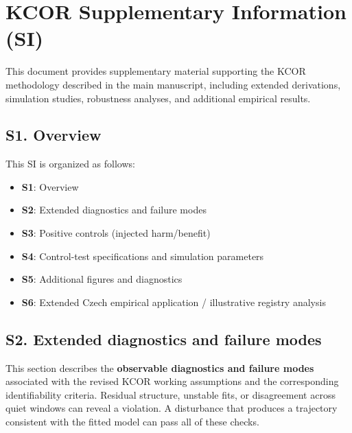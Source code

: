 \documentclass[
]{article}
\providecommand{\tightlist}{%
  \setlength{\itemsep}{0pt}\setlength{\parskip}{0pt}}
\newcounter{kcorappendix}
\renewcommand{\thefigure}{\Alph{kcorappendix}.\arabic{figure}}%
\renewcommand{\thetable}{\Alph{kcorappendix}.\arabic{table}}%
\begin{document}
\newpage

\section{KCOR Supplementary Information (SI)}\label{kcor-supplementary-information-si}

\renewcommand{\thefigure}{S\arabic{figure}}%
\setcounter{figure}{0}%
\renewcommand{\thetable}{S\arabic{table}}%
\setcounter{table}{0}%

This document provides supplementary material supporting the KCOR methodology described in the main manuscript, including extended derivations, simulation studies, robustness analyses, and additional empirical results.

\subsection{S1. Overview}\label{s1.-overview}

This SI is organized as follows:

\begin{itemize}
\tightlist
\item
  \textbf{S1}: Overview
\item
  \textbf{S2}: Extended diagnostics and failure modes
\item
  \textbf{S3}: Positive controls (injected harm/benefit)
\item
  \textbf{S4}: Control-test specifications and simulation parameters
\item
  \textbf{S5}: Additional figures and diagnostics
\item
  \textbf{S6}: Extended Czech empirical application / illustrative registry analysis
\end{itemize}

\subsection{S2. Extended diagnostics and failure modes}\label{s2.-extended-diagnostics-and-failure-modes}

This section describes the \textbf{observable diagnostics and failure modes} associated with the revised KCOR working assumptions and the corresponding identifiability criteria. Residual structure, unstable fits, or disagreement across quiet windows can reveal a violation. A disturbance that produces a trajectory consistent with the fitted model can pass all of these checks.
\end{document}
